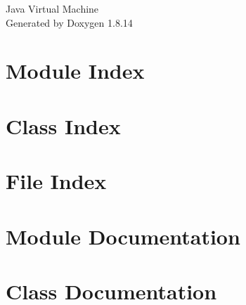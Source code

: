 \documentclass[twoside]{book}
\newcommand{\+}{\discretionary{\mbox{\scriptsize$\hookleftarrow$}}{}{}}
\newcommand{\clearemptydoublepage}{%
  \newpage{\pagestyle{empty}\cleardoublepage}%
}
\begin{document}
\hypersetup{pageanchor=false,
             bookmarksnumbered=true,
             pdfencoding=unicode
            }
\begin{titlepage}
\vspace*{7cm}
\begin{center}%
{\Large Java Virtual Machine }\\
\vspace*{1cm}
{\large Generated by Doxygen 1.8.14}\\
\end{center}
\end{titlepage}
\clearemptydoublepage
{}
\tableofcontents
\clearemptydoublepage
{}
\hypersetup{pageanchor=true}

\chapter{Module Index}

\chapter{Class Index}

\chapter{File Index}

\chapter{Module Documentation}

\chapter{Class Documentation}











































\end{document}
